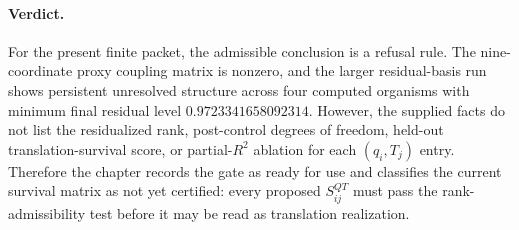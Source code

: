\paragraph{Verdict.}
For the present finite packet, the admissible conclusion is a refusal rule.  The nine-coordinate proxy coupling matrix is nonzero, and the larger residual-basis run shows persistent unresolved structure across four computed organisms with minimum final residual level $0.9723341658092314$.  However, the supplied facts do not list the residualized rank, post-control degrees of freedom, held-out translation-survival score, or partial-$R^2$ ablation for each $(q_i,T_j)$ entry.  Therefore the chapter records the gate as ready for use and classifies the current survival matrix as not yet certified: every proposed $S^{QT}_{ij}$ must pass the rank-admissibility test before it may be read as translation realization.
